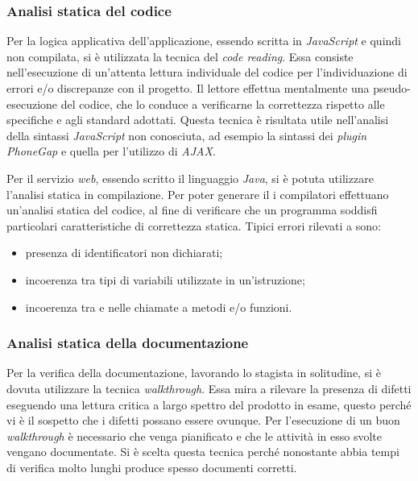 \subsubsection{Analisi statica del codice}


Per la logica applicativa dell'applicazione, essendo scritta in \textit{JavaScript} e quindi non compilata, si è utilizzata la tecnica del \textit{code reading}. Essa consiste nell'esecuzione di un'attenta lettura individuale del codice per l'individuazione di errori e/o discrepanze con il progetto. Il lettore effettua mentalmente una pseudo-esecuzione del codice, che lo conduce a verificarne la correttezza rispetto alle specifiche e agli standard adottati. Questa tecnica è risultata utile nell'analisi della sintassi \textit{JavaScript} non conosciuta, ad esempio la sintassi dei \textit{plugin PhoneGap} e quella per l'utilizzo di \textit{AJAX}.


Per il servizio \textit{web}, essendo scritto il linguaggio \textit{Java}, si è potuta utilizzare l'analisi statica in compilazione. Per poter generare il  i compilatori effettuano un'analisi statica del codice, al fine di verificare che un programma soddisfi particolari caratteristiche di correttezza statica. Tipici errori rilevati a  sono:
\begin{itemize}
	\item presenza di identificatori non dichiarati;
	\item incoerenza tra tipi di variabili utilizzate in un'istruzione;
	\item incoerenza tra  e  nelle chiamate a metodi e/o funzioni.
\end{itemize}

\subsubsection{Analisi statica della documentazione}

Per la verifica della documentazione, lavorando lo stagista in solitudine, si è dovuta utilizzare la tecnica \textit{walkthrough}. Essa mira a rilevare la presenza di difetti eseguendo una lettura critica a largo spettro del prodotto in esame, questo perché vi è il sospetto che i difetti possano essere ovunque. Per l'esecuzione di un buon \textit{walkthrough} è necessario che venga pianificato e che le attività in esso svolte vengano documentate. Si è scelta questa tecnica perché nonostante abbia tempi di verifica molto lunghi produce spesso documenti corretti.

